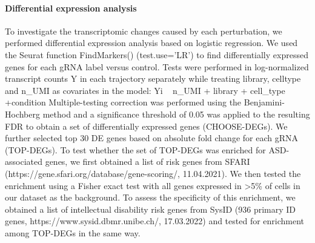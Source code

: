 \paragraph{Differential expression analysis}
To investigate the transcriptomic changes caused by each perturbation, we performed differential expression analysis based on logistic regression. We used the Seurat function FindMarkers() (test.use=’LR’) to find differentially expressed genes for each gRNA label versus control. Tests were performed in log-normalized transcript counts Y in each trajectory separately while treating library, celltype and n\_UMI as covariates in the model:
    Yi ~ n\_UMI + library + cell\_type +condition 
Multiple-testing correction was performed using the Benjamini-Hochberg method and a significance threshold of 0.05 was applied to the resulting FDR to obtain a set of differentially expressed genes (CHOOSE-DEGs).  We further selected top 30 DE genes based on absolute fold change for each gRNA (TOP-DEGs). To test whether the set of TOP-DEGs was enriched for ASD-associated genes, we first obtained a list of risk genes from SFARI (https://gene.sfari.org/database/gene-scoring/, 11.04.2021). We then tested the enrichment using a Fisher exact test with all genes expressed in >5\% of cells in our dataset as the background. To assess the specificity of this enrichment, we obtained a list of intellectual disability risk genes from SysID (936 primary ID genes, https://www.sysid.dbmr.unibe.ch/, 17.03.2022) and tested for enrichment among TOP-DEGs in the same way.

